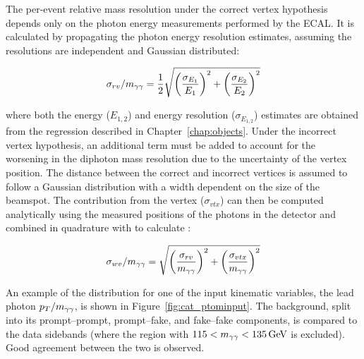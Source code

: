 The per-event relative mass resolution under the correct vertex hypothesis 
depends only on the photon energy measurements performed by the ECAL.
It is calculated by propagating the photon energy resolution estimates, 
assuming the resolutions are independent and Gaussian distributed:

\begin{equation}
  \sigma_{rv}/m_{\gamma\gamma} = \frac{1}{2} \sqrt{\left(\frac{\sigma_{E_1}}{E_1}\right)^{2}
                              + \left(\frac{\sigma_{E_2}}{E_2}\right)^{2}}
\end{equation}

where both the energy ($E_{1,2}$) and energy resolution ($\sigma_{E_{1,2}}$) estimates 
are obtained from the regression described in Chapter~\ref{chap:objects}.
Under the incorrect vertex hypothesis, an additional term must be added to account for the 
worsening in the diphoton mass resolution due to the uncertainty of the vertex position.
The distance between the correct and incorrect vertices is assumed to follow a Gaussian distribution
with a width dependent on the size of the beamspot.
The contribution from the vertex ($\sigma_{vtx}$) can then be computed analytically 
using the measured positions of the photons in the detector 
and combined in quadrature with \srv to calculate \swv:

\begin{equation}
  \sigma_{wv}/m_{\gamma\gamma} = \sqrt{\left(\frac{\sigma_{rv}}{m_{\gamma\gamma}}\right)^{2}
                              + \left(\frac{\sigma_{vtx}}{m_{\gamma\gamma}}\right)^{2}}
\end{equation}

An example of the distribution for one of the input kinematic variables, the lead photon $p_T/m_{\gamma\gamma}$, 
is shown in Figure~\ref{fig:cat_ptominput}.
The background, split into its prompt--prompt, prompt--fake, and fake--fake components, 
is compared to the data sidebands (where the region with $115 < m_{\gamma\gamma} < \SI{135}{GeV}$ is excluded).
Good agreement between the two is observed.

